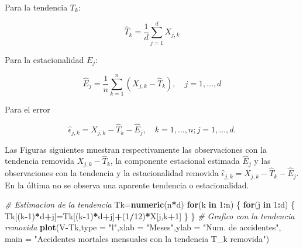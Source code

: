 \documentclass[12pt,]{krantz}
\makeatletter
\newenvironment{Shaded}{\begin{snugshade}}{\end{snugshade}}
\newcommand{\KeywordTok}[1]{\textcolor[rgb]{0.13,0.29,0.53}{\textbf{#1}}}
\newcommand{\DataTypeTok}[1]{\textcolor[rgb]{0.13,0.29,0.53}{#1}}
\newcommand{\DecValTok}[1]{\textcolor[rgb]{0.00,0.00,0.81}{#1}}
\newcommand{\StringTok}[1]{\textcolor[rgb]{0.31,0.60,0.02}{#1}}
\newcommand{\CommentTok}[1]{\textcolor[rgb]{0.56,0.35,0.01}{\textit{#1}}}
\newcommand{\ControlFlowTok}[1]{\textcolor[rgb]{0.13,0.29,0.53}{\textbf{#1}}}
\newcommand{\OperatorTok}[1]{\textcolor[rgb]{0.81,0.36,0.00}{\textbf{#1}}}
\newcommand{\NormalTok}[1]{#1}
\newenvironment{kframe}{%
\medskip{}
\setlength{\fboxsep}{.8em}
 \def\at@end@of@kframe{}%
 \ifinner\ifhmode%
  \def\at@end@of@kframe{\end{minipage}}%
  \begin{minipage}{\columnwidth}%
 \fi\fi%
 \def\FrameCommand##1{\hskip\@totalleftmargin \hskip-\fboxsep
 \colorbox{shadecolor}{##1}\hskip-\fboxsep
     \hskip-\linewidth \hskip-\@totalleftmargin \hskip\columnwidth}%
 \MakeFramed {\advance\hsize-\width
   \@totalleftmargin\z@ \linewidth\hsize
   \@setminipage}}%
 {\par\unskip\endMakeFramed%
 \at@end@of@kframe}
\renewenvironment{Shaded}{\begin{kframe}}{\end{kframe}}
\theoremstyle{definition}
\theoremstyle{definition}
\theoremstyle{definition}
\theoremstyle{remark}
\makeatother
\begin{document}
Para la tendencia \(T_k\):

\begin{equation}
\hat{T}_k=\frac{1}{d}\sum_{j=1}^dX_{j,k}
\label{eq:eq-estimador-Tk-E1}
\end{equation}

Para la estacionalidad \(E_j\):

\begin{equation}
\hat{E}_j=\frac{1}{n}\sum_{k=1}^n(X_{j,k}-\hat{T}_k),\quad j=1,\ldots,d
\label{eq:eq-estimador-Ej-E1}
\end{equation}

Para el error

\begin{equation}
\hat{\epsilon}_{j,k}=X_{j,k}-\hat{T}_k-\hat{E}_j,\quad k=1,\ldots,n; j=1,\ldots,d.
\label{eq:eq-estimador-error-E1}
\end{equation}

Las Figuras siguientes muestran respectivamente las observaciones con la
tendencia removida \(X_{j,k}-\hat{T}_k\), la componente estacional
estimada \(\hat{E}_j\) y las observaciones con la tendencia y la
estacionalidad removida
\(\hat{\epsilon}_{j,k}=X_{j,k}-\hat{T}_k-\hat{E}_j\). En la última no se
observa una aparente tendencia o estacionalidad.

\begin{Shaded}
\begin{Highlighting}[]
\CommentTok{# Estimacion de la tendencia}
\NormalTok{Tk=}\KeywordTok{numeric}\NormalTok{(n}\OperatorTok{*}\NormalTok{d)}
\ControlFlowTok{for}\NormalTok{(k }\ControlFlowTok{in} \DecValTok{1}\OperatorTok{:}\NormalTok{n)}
\NormalTok{\{}
  \ControlFlowTok{for}\NormalTok{(j }\ControlFlowTok{in} \DecValTok{1}\OperatorTok{:}\NormalTok{d)}
\NormalTok{  \{}
\NormalTok{    Tk[(k}\OperatorTok{-}\DecValTok{1}\NormalTok{)}\OperatorTok{*}\NormalTok{d}\OperatorTok{+}\NormalTok{j]=Tk[(k}\OperatorTok{-}\DecValTok{1}\NormalTok{)}\OperatorTok{*}\NormalTok{d}\OperatorTok{+}\NormalTok{j]}\OperatorTok{+}\NormalTok{(}\DecValTok{1}\OperatorTok{/}\DecValTok{12}\NormalTok{)}\OperatorTok{*}\NormalTok{X[j,k}\OperatorTok{+}\DecValTok{1}\NormalTok{]}
\NormalTok{  \}}
\NormalTok{\}}
\CommentTok{# Grafico con la tendencia removida}
\KeywordTok{plot}\NormalTok{(V}\OperatorTok{-}\NormalTok{Tk,}\DataTypeTok{type =} \StringTok{"l"}\NormalTok{,}\DataTypeTok{xlab =} \StringTok{"Meses"}\NormalTok{,}\DataTypeTok{ylab =} \StringTok{"Num. de accidentes"}\NormalTok{,}
     \DataTypeTok{main =} \StringTok{"Accidentes mortales mensuales con la tendencia T_k removida"}\NormalTok{)}
\end{Highlighting}
\end{Shaded}
\end{document}
